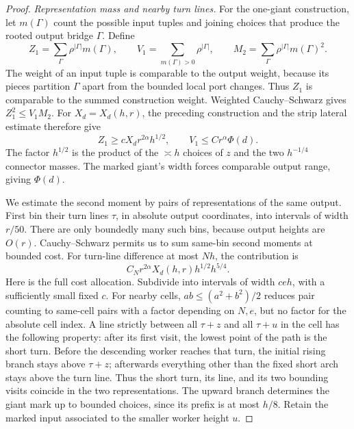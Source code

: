 \begin{proof}
\smallskip\noindent\emph{Representation mass and nearby turn lines.}
For the one-giant construction, let $m(\Gamma)$ count the possible
input tuples and joining choices that produce the rooted output bridge
$\Gamma$. Define
\[
 Z_1=\sum_\Gamma\rho^{|\Gamma|}m(\Gamma),\qquad
 V_1=\sum_{m(\Gamma)>0}\rho^{|\Gamma|},\qquad
 M_2=\sum_\Gamma\rho^{|\Gamma|}m(\Gamma)^2.
\]
The weight of an input tuple is comparable to the output weight,
because its pieces partition $\Gamma$ apart from the bounded local
port changes. Thus $Z_1$ is comparable to the summed construction
weight. Weighted Cauchy--Schwarz gives $Z_1^2\le V_1M_2$.
For $X_d=X_d(h,r)$, the preceding construction and the strip lateral
estimate therefore give
\[
 Z_1\ge cX_d r^{2\alpha}h^{1/2},\qquad
 V_1\le Cr^\alpha\Phi(d).
\]
The factor \(h^{1/2}\) is the product of the \(\asymp h\) choices of
\(z\) and the two \(h^{-1/4}\) connector masses. The marked giant's
width forces comparable output range, giving \(\Phi(d)\).

We estimate the second moment by pairs of representations of the same
output. First bin their turn lines \(\tau\), in absolute output coordinates,
into intervals of width \(r/50\). There are only boundedly many such
bins, because output heights are \(O(r)\). Cauchy--Schwarz permits us to
sum same-bin second moments at bounded cost. For turn-line difference
at most \(Nh\), the contribution is
\begin{equation}
 C_Nr^{2\alpha}X_d(h,r)h^{1/2}h^{5/4}.\label{eq:T-35}
\end{equation}
Here is the full cost allocation. Subdivide into intervals of width
\(ceh\), with a sufficiently small fixed \(c\). For nearby cells,
\(ab\le(a^2+b^2)/2\) reduces pair counting to same-cell pairs with a
factor depending on \(N,e\), but no factor for the absolute cell index.
A line strictly between all \(\tau+z\) and all \(\tau+u\) in the cell has the
following property: after its first visit, the lowest point of the path
is the short turn. Before the descending worker reaches that turn, the
initial rising branch stays above \(\tau+z\); afterwards everything other
than the fixed short arch stays above the turn line. Thus the short
turn, its line, and its two bounding visits coincide in the two
representations. The upward branch determines the giant mark up to
bounded choices, since its prefix is at most \(h/8\). Retain the marked
input associated to the smaller worker height \(u\).


\end{proof}
